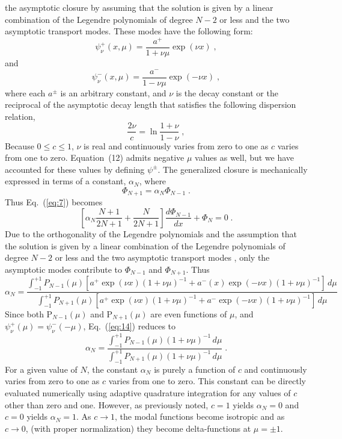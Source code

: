 \documentclass[12pt]{article}
\newcommand{\bracket}[1]{\left[ #1 \right]}
\newcommand{\dddx}[1]{\frac{d #1}{d x}}
\newcommand{\be}{\begin{equation}}
\newcommand{\ee}{\end{equation}}
\newcommand{\pec}{\; ,}
\newcommand{\pep}{\; .}
\newcommand{\LEQ}[1]{\label{eq:#1}}
\newcommand{\EQ}[1]{Eq.~(\ref{eq:#1})}
\newcommand{\bc}{\begin{center}}
\newcommand{\ec}{\end{center}}
\begin{document}
the asymptotic closure by assuming that the solution is given by a linear combination of the Legendre 
polynomials of degree $N-2$ or less and the two asymptotic transport modes. These modes have the following 
form:
\be
\psi^+_{\nu}(x,\mu) = \frac{a^+}{1 + \nu \mu}\exp(\nu x) \pec
\LEQ{10}
\ee
and 
\be
\psi^-_{\nu}(x,\mu) = \frac{a^-}{1 - \nu \mu} \exp(-\nu x) \pec
\LEQ{11}
\ee
where each $a^{\pm}$ is an arbitrary constant, and $\nu$ is the decay constant or the reciprocal of the asymptotic decay length 
that satisfies the following dispersion relation,
\be
\frac{2\nu}{c}=\ln\frac{1+\nu}{1-\nu} \pec
\LEQ{12}
\ee
Because $0 \le c  \le 1$, $\nu$ is real and continuously varies from zero to one as $c$ varies from one to zero. 
Equation~(12) admits negative $\mu$ values as well, but we have accounted for these values by defining $\psi^{\pm}$.
The generalized closure is mechanically expressed in terms of a constant, $\alpha_N$, 
where 
\be
\Phi_{N+1}=\alpha_N \Phi_{N-1} \pep
\LEQ{13}
\ee
Thus \EQ{7} becomes 
\be
\bracket{ \alpha_N \frac{N+1}{2N+1}  +  \frac{N}{2N+1} }\dddx{\Phi_{N-1}} + \Phi_N = 0 \pep
\LEQ{13a}
\ee
Due to the orthogonality of the Legendre polynomials and the assumption that the solution is given by 
a linear combination of the Legendre polynomials of degree $N-2$ or less and the two asymptotic transport modes , 
only the asymptotic modes contribute to $\Phi_{N-1}$ and $\Phi_{N+1}$. Thus 
\be
\alpha_N = \frac{
 \int_{-1}^{+1} P_{N-1}(\mu) \bracket{a^+ \exp(\nu x)(1 + \nu \mu)^{-1} + a^-(x) \exp(-\nu x)(1 + \nu \mu)^{-1}} \, d\mu
}
{
 \int_{-1}^{+1} P_{N+1}(\mu) \bracket{a^+ \exp(\nu x)(1 + \nu \mu)^{-1} + a^- \exp(-\nu x) (1 + \nu \mu)^{-1}} \, d\mu
}
\LEQ{14}
\ee
Since both P$_{N-1}(\mu)$ and P$_{N+1}(\mu)$ are even functions of $\mu$, and $\psi^+_{\nu}(\mu)=\psi^-_{\nu}(-\mu)$, 
\EQ{14} reduces to 
\be
\alpha_N = \frac{\int_{-1}^{+1} P_{N-1}(\mu)(1 + \nu \mu)^{-1} \, d\mu}{\int_{-1}^{+1} P_{N+1}(\mu)(1 + \nu \mu)^{-1} \, d\mu} \pep
\LEQ{15}
\ee 
For a given value of $N$, the constant $\alpha_N$ is purely a function of $c$ and continuously varies from zero to one as $c$ varies from one to zero. 
This constant can be directly evaluated numerically using adaptive quadrature integration for any values of $c$ other than 
zero and one. However, as previously noted, $c=1$ yields $\alpha_N=0$ and $c=0$ yields $\alpha_N=1$.  As $c \rightarrow 1$, the 
modal functions become isotropic and as $c \rightarrow 0$, (with proper normalization) they become delta-functions at 
$\mu=\pm 1$. 

\end{document}
